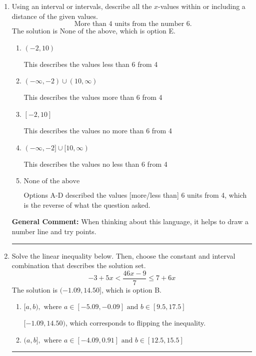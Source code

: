 \documentclass{extbook}[14pt]
\newcommand{\litem}[1]{\item #1

\rule{\textwidth}{0.4pt}}
\begin{document}
\begin{enumerate}
{\begin{enumerate}[label=\Alph*.]
 $(1.5, \infty)$, which corresponds to negating the endpoint of the solution.
\item \( \text{None of the above}. \)

You may have chosen this if you thought the inequality did not match the ends of the intervals.
\end{enumerate}

\textbf{General Comment:} Remember that less/greater than or equal to includes the endpoint, while less/greater do not. Also, remember that you need to flip the inequality when you multiply or divide by a negative.
}
\litem{
Using an interval or intervals, describe all the $x$-values within or including a distance of the given values.
\[ \text{ More than } 4 \text{ units from the number } 6. \]The solution is \( \text{None of the above} \), which is option E.\begin{enumerate}[label=\Alph*.]
\item \( (-2, 10) \)

This describes the values less than 6 from 4
\item \( (-\infty, -2) \cup (10, \infty) \)

This describes the values more than 6 from 4
\item \( [-2, 10] \)

This describes the values no more than 6 from 4
\item \( (-\infty, -2] \cup [10, \infty) \)

This describes the values no less than 6 from 4
\item \( \text{None of the above} \)

Options A-D described the values [more/less than] 6 units from 4, which is the reverse of what the question asked.
\end{enumerate}

\textbf{General Comment:} When thinking about this language, it helps to draw a number line and try points.
}
\litem{
Solve the linear inequality below. Then, choose the constant and interval combination that describes the solution set.
\[ -3 + 5 x < \frac{46 x - 9}{7} \leq 7 + 6 x \]The solution is \( (-1.09, 14.50] \), which is option B.\begin{enumerate}[label=\Alph*.]
\item \( [a, b), \text{ where } a \in [-5.09, -0.09] \text{ and } b \in [9.5, 17.5] \)

$[-1.09, 14.50)$, which corresponds to flipping the inequality.
\item \( (a, b], \text{ where } a \in [-4.09, 0.91] \text{ and } b \in [12.5, 15.5] \)


\end{enumerate}}
\end{enumerate}
\end{document}
